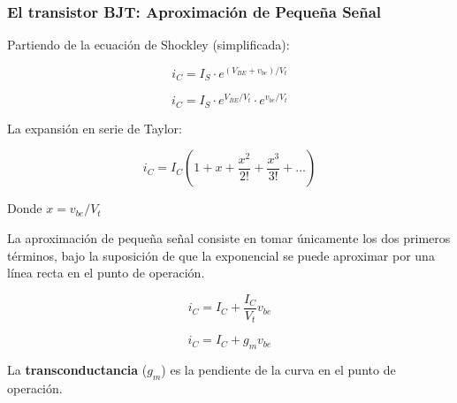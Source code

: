 \begin{frame}[t]
    \frametitle{El transistor BJT: Aproximación de Peque\~{n}a Se\~{n}al}

    \begin{multicols}{2}

        Partiendo de la ecuación de Shockley (simplificada):
        
        \[ i_C = I_S \cdot e^{(V_{BE}+v_{be})/V_t} \]

        \[ i_C = I_S \cdot e^{V_{BE}/V_t} \cdot e^{v_{be}/V_t}\]

        La expansión en serie de Taylor:

        \[ i_C = I_C \left( 1 + x + \dfrac{x^2}{2!} + \dfrac{x^3}{3!} + ... \right) \]

        Donde $x = v_{be}/V_t$

        \newpage
        La aproximación de peque\~{n}a se\~{n}al consiste en tomar únicamente los dos primeros términos, bajo la suposición de que la exponencial se puede aproximar por una línea recta en el punto de operación.

        \[ i_C = I_C + \dfrac{I_C}{V_t} v_{be} \]

        \[ i_C = I_C + g_m v_{be} \]
    \end{multicols}

    \vspace{8mm}
    La \textbf{transconductancia} ($g_m$) es la pendiente de la curva en el punto de operación.
\end{frame}

